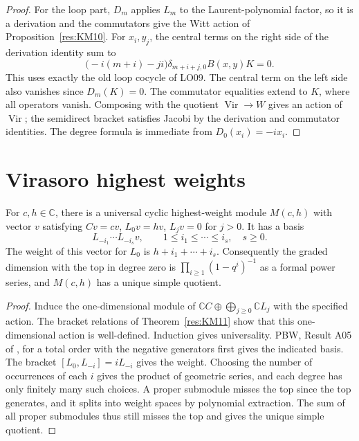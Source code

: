 \begin{proof}
For the loop part, \(D_m\) applies \(L_m\) to the Laurent-polynomial
factor, so it is a derivation and the commutators give the Witt
action of Proposition~\ref{res:KM10}. For \(x_i,y_j\), the central
terms on the right side of the derivation identity sum to
\[
 \bigl(-i(m+i)-ji\bigr)\delta_{m+i+j,0}B(x,y)K=0 .
\]
This uses exactly the old loop cocycle of LO09. The central
term on the left side also vanishes since \(D_m(K)=0\).
The commutator equalities extend to \(K\), where all operators
vanish. Composing with the quotient
\(\operatorname{Vir}\to W\) gives an action of \(\operatorname{Vir}\);
the semidirect bracket satisfies Jacobi by the derivation and
commutator identities. The degree formula is immediate from
\(D_0(x_i)=-i x_i\).
\end{proof}

\section{Virasoro highest weights}

\begin{theorem}
\label{res:KM13}
For \(c,h\in\mathbb C\), there is a universal cyclic
highest-weight module \(M(c,h)\) with vector \(v\) satisfying
\(Cv=cv\), \(L_0v=hv\), \(L_jv=0\) for \(j>0\).
It has a basis
\[
 L_{-i_1}\cdots L_{-i_s}v,\qquad
       1\le i_1\le\cdots\le i_s,\quad s\ge0 .
\]
The weight of this vector for \(L_0\) is \(h+i_1+\cdots+i_s\).
Consequently the graded dimension with the top in degree zero is
\(\prod_{i\ge1}(1-q^i)^{-1}\) as a formal power series,
and \(M(c,h)\) has a unique simple quotient.
\end{theorem}

\begin{proof}
Induce the one-dimensional module of
\(\mathbb C C\oplus\bigoplus_{j\ge0}\mathbb C L_j\)
with the specified action. The bracket relations of
Theorem~\ref{res:KM11} show that this one-dimensional action
is well-defined. Induction gives universality. PBW, Result A05 of
\cite[PDF pp.~8--9]{mg-lie}, for a total order with the negative
generators first gives the indicated basis.
The bracket \([L_0,L_{-i}]=iL_{-i}\) gives the weight.
Choosing the number of occurrences of each \(i\) gives the product
of geometric series, and each degree has only finitely many such
choices. A proper submodule misses the top since the top generates,
and it splits into weight spaces by polynomial extraction.
The sum of all proper submodules thus still misses the top
and gives the unique simple quotient.
\end{proof}

